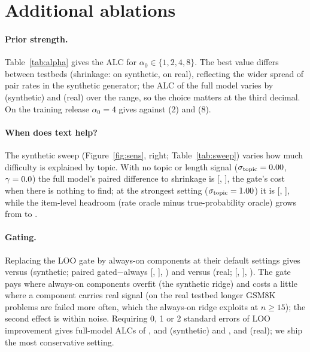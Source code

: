 \documentclass{article}
\begin{document}
\section{Additional ablations}
\label{app:ablations}

\paragraph{Prior strength.}
Table~\ref{tab:alpha} gives the ALC for $\alpha_0\in\{1,2,4,8\}$. The best value differs between testbeds (shrinkage: \SAlphaBestShrink{} on synthetic, \RAlphaBestShrink{} on real), reflecting the wider spread of pair rates in the synthetic generator; the ALC of the full model varies by \SAlphaFullRange{} (synthetic) and \RAlphaFullRange{} (real) over the range, so the choice matters at the third decimal. On the training release $\alpha_0=4$ gives \FitRelHandAlphaFourAlc{} against \FitRelHandAlphaTwoAlc{} (2) and \FitRelHandAlphaEightAlc{} (8).

\paragraph{When does text help?}
The synthetic sweep (Figure~\ref{fig:sens}, right; Table~\ref{tab:sweep}) varies how much difficulty is explained by topic. With no topic or length signal ($\sigma_{\mathrm{topic}}=0.00$, $\gamma=0.0$) the full model's paired difference to shrinkage is \SSweepAPairFullShrinkMean{} [\SSweepAPairFullShrinkLo, \SSweepAPairFullShrinkHi], the gate's cost when there is nothing to find; at the strongest setting ($\sigma_{\mathrm{topic}}=1.00$) it is \SSweepEPairFullShrinkMean{} [\SSweepEPairFullShrinkLo, \SSweepEPairFullShrinkHi], while the item-level headroom (rate oracle minus true-probability oracle) grows from \SSweepAHeadroomItem{} to \SSweepEHeadroomItem.

\paragraph{Gating.}
Replacing the LOO gate by always-on components at their default settings gives \SLooAlwaysFullAlc{} versus \SLooGatedFullAlc{} (synthetic; paired gated$-$always \SLooPairGatedAlwaysMean{} [\SLooPairGatedAlwaysLo, \SLooPairGatedAlwaysHi], \SLooPairGatedAlwaysSig) and \RLooAlwaysFullAlc{} versus \RLooGatedFullAlc{} (real; \RLooPairGatedAlwaysMean{} [\RLooPairGatedAlwaysLo, \RLooPairGatedAlwaysHi], \RLooPairGatedAlwaysSig). The gate pays where always-on components overfit (the synthetic ridge) and costs a little where a component carries real signal (on the real testbed longer GSM8K problems are failed more often, which the always-on ridge exploits at $n\ge 15$); the second effect is within noise. Requiring 0, 1 or 2 standard errors of LOO improvement gives full-model ALCs of \SLooMultZeroFullAlc, \SLooMultOneFullAlc{} and \SLooMultTwoFullAlc{} (synthetic) and \RLooMultZeroFullAlc, \RLooMultOneFullAlc{} and \RLooMultTwoFullAlc{} (real); we ship the most conservative setting.
\end{document}
